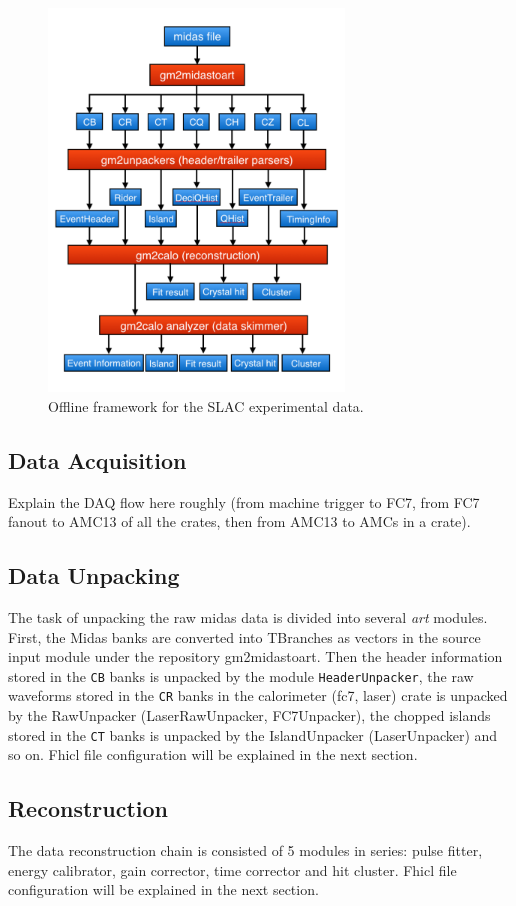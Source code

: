 \begin{figure}[htbp]
\centering
\includegraphics[width=0.7\textwidth]{pics/offline_slac_framework}
\caption{Offline framework for the SLAC experimental data.}
\end{figure}

\subsection{Data Acquisition}
Explain the DAQ flow here roughly (from machine trigger to FC7, from FC7 fanout to AMC13 of all the crates, then from AMC13 to AMCs in a crate).


\subsection{Data Unpacking}
The task of unpacking the raw midas data is divided into several \textit{art} modules. First, the Midas banks are converted into TBranches as vectors in the source input module under the repository gm2midastoart.
Then the header information stored in the \verb+CB+ banks is unpacked by the module \verb+HeaderUnpacker+, 
the raw waveforms stored in the \verb+CR+ banks in the calorimeter (fc7, laser) crate is unpacked by the RawUnpacker (LaserRawUnpacker, FC7Unpacker), the chopped islands stored in the \verb+CT+ banks
is unpacked by the IslandUnpacker (LaserUnpacker) and so on. Fhicl file configuration will be explained in the next section.

\subsection{Reconstruction}
The data reconstruction chain is consisted of 5 modules in series: pulse fitter, energy calibrator, gain corrector, time corrector and hit cluster. Fhicl file configuration will be explained in the next section.